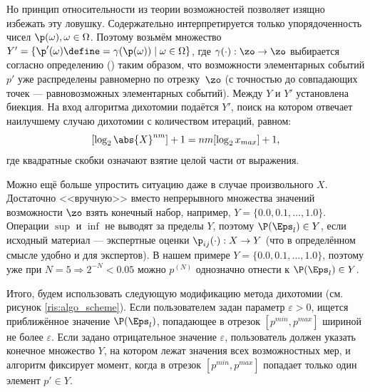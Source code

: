 Но принцип относительности из теории возможностей позволяет изящно избежать эту ловушку. Содержательно интерпретируется только упорядоченность чисел $\p(\omega), \omega\in\Omega$. Поэтому возьмём множество $Y' = \{\p'(\omega) \define= \gamma(\p(\omega))\mid\omega\in\Omega\}$, где $\gamma(\cdot): \zo \to \zo$ выбирается согласно определению () таким образом, что возможности элементарных событий $p'$ уже распределены равномерно по отрезку~$\zo$ (с точностью до совпадающих точек --- равновозможных элементарных событий). Между $Y$ и $Y'$ установлена биекция. На вход алгоритма дихотомии подаётся $Y'$, поиск на котором отвечает наилучшему случаю дихотомии с количеством итераций, равном:
\begin{equation*}
  \label{e:}
  [ \log_{2}{\abs{X}^{nm}} ] + 1 = nm[ \log_{2}{x_{max}} ] + 1,
\end{equation*}
 где квадратные скобки означают взятие целой части от выражения.
 

Можно ещё больше упростить ситуацию даже в случае произвольного $X$. Достаточно <<вручную>> вместо непрерывного множества значений возможности $\zo$ взять конечный набор, например, $Y = \{0.0, 0.1, \ldots, 1.0\}$. Операции $\sup$ и $\inf$ не выводят за пределы $Y$, поэтому $\P(\Eps_l) \in Y$, если исходный материал --- экспертные оценки $\p_{ij}(\cdot): X \rightarrow Y$ (что в определённом смысле удобно и для экспертов). В нашем примере $Y = \{0.0, 0.1, \ldots, 1.0\}$, поэтому уже при $N = 5 \Rightarrow 2^{-N} < 0.05$ можно $p^{(N)}$ однозначно отнести к $\P(\Eps_l) \in Y$.

Итого, будем использовать следующую модификацию метода дихотомии (см. рисунок \ref{ris:algo_scheme}). Если пользователем задан параметр $\varepsilon > 0$, ищется приближённое значение $\P(\Eps_l)$, попадающее в отрезок $[p^{min}, p^{max}]$ шириной не более $\varepsilon$. Если задано отрицательное значение $\varepsilon$, пользователь должен указать конечное множество $Y$, на котором лежат значения всех возможностных мер, и алгоритм фиксирует момент, когда в отрезок $[p^{min}, p^{max}]$ попадает только один элемент $p' \in Y$. %

